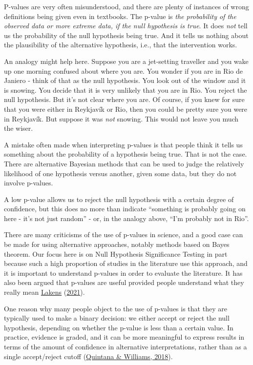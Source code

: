 \documentclass{krantz}
\begin{document}
P-values are very often misunderstood, and there are plenty of instances of wrong definitions being given even in textbooks. The p-value is \emph{the probability of the observed data or more extreme data, if the null hypothesis is true}. It does \emph{not} tell us the probability of the null hypothesis being true. And it tells us nothing about the plausibility of the alternative hypothesis, i.e., that the intervention works.

An analogy might help here. Suppose you are a jet-setting traveller and you wake up one morning confused about where you are. You wonder if you are in Rio de Janiero - think of that as the null hypothesis. You look out of the window and it is snowing. You decide that it is very unlikely that you are in Rio. You reject the null hypothesis. But it's not clear where you are. Of course, if you knew for sure that you were either in Reykjavík or Rio, then you could be pretty sure you were in Reykjavík. But suppose it was \emph{not} snowing. This would not leave you much the wiser.

A mistake often made when interpreting p-values is that people think it tells us something about the probability of a hypothesis being true. That is not the case. There are alternative Bayesian methods that can be used to judge the relatively likelihood of one hypothesis versus another, given some data, but they do not involve p-values.

A low p-value allows us to reject the null hypothesis with a certain degree of confidence, but this does no more than indicate ``something is probably going on here - it's not just random'' - or, in the analogy above, ``I'm probably not in Rio''.

\begin{tcolorbox}[colback=Black!5!lightgray,colframe=black!75!black,coltitle=white,title=Criticisms of the use of p-values]\label{box:pvalues}
There are many criticisms of the use of p-values in science, and a good case can be made for using alternative approaches, notably methods based on Bayes theorem. Our focus here is on Null Hypothesis Significance Testing in part because such a high proportion of studies in the literature use this approach, and it is important to understand p-values in order to evaluate the literature. It has also been argued that p-values are useful provided people understand what they really mean \protect\hyperlink{ref-lakens2021}{Lakens} (\protect\hyperlink{ref-lakens2021}{2021}).

One reason why many people object to the use of p-values is that they are typically used to make a binary decision: we either accept or reject the null hypothesis, depending on whether the p-value is less than a certain value. In practice, evidence is graded, and it can be more meaningful to express results in terms of the amount of confidence in alternative interpretations, rather than as a single accept/reject cutoff (\protect\hyperlink{ref-quintana2018}{Quintana \& Williams, 2018}).
\end{tcolorbox}
\end{document}
